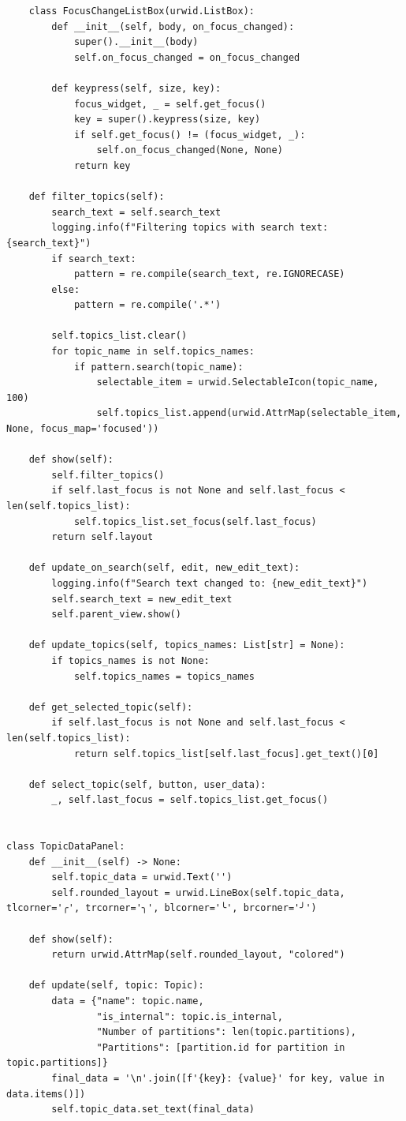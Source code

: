\documentclass[10pt , a4paper]{report}
\newenvironment{code}{\captionsetup{type=listing}}{}
\begin{document}
\begin{code}
\begin{verbatim}
    class FocusChangeListBox(urwid.ListBox):
        def __init__(self, body, on_focus_changed):
            super().__init__(body)
            self.on_focus_changed = on_focus_changed

        def keypress(self, size, key):
            focus_widget, _ = self.get_focus()
            key = super().keypress(size, key)
            if self.get_focus() != (focus_widget, _):
                self.on_focus_changed(None, None)
            return key
        
    def filter_topics(self):
        search_text = self.search_text
        logging.info(f"Filtering topics with search text: {search_text}")
        if search_text:
            pattern = re.compile(search_text, re.IGNORECASE)
        else:
            pattern = re.compile('.*')
        
        self.topics_list.clear()
        for topic_name in self.topics_names:
            if pattern.search(topic_name):
                selectable_item = urwid.SelectableIcon(topic_name, 100)
                self.topics_list.append(urwid.AttrMap(selectable_item, None, focus_map='focused'))

    def show(self):
        self.filter_topics()
        if self.last_focus is not None and self.last_focus < len(self.topics_list):
            self.topics_list.set_focus(self.last_focus)
        return self.layout
    
    def update_on_search(self, edit, new_edit_text):
        logging.info(f"Search text changed to: {new_edit_text}")
        self.search_text = new_edit_text
        self.parent_view.show()
            
    def update_topics(self, topics_names: List[str] = None):
        if topics_names is not None:
            self.topics_names = topics_names

    def get_selected_topic(self):
        if self.last_focus is not None and self.last_focus < len(self.topics_list):
            return self.topics_list[self.last_focus].get_text()[0]

    def select_topic(self, button, user_data):
        _, self.last_focus = self.topics_list.get_focus()


class TopicDataPanel:
    def __init__(self) -> None:
        self.topic_data = urwid.Text('')
        self.rounded_layout = urwid.LineBox(self.topic_data, tlcorner='╭', trcorner='╮', blcorner='╰', brcorner='╯')

    def show(self):
        return urwid.AttrMap(self.rounded_layout, "colored")

    def update(self, topic: Topic):
        data = {"name": topic.name,
                "is_internal": topic.is_internal,
                "Number of partitions": len(topic.partitions),
                "Partitions": [partition.id for partition in topic.partitions]}
        final_data = '\n'.join([f'{key}: {value}' for key, value in data.items()])
        self.topic_data.set_text(final_data)

  \end{verbatim}
\end{code}
\end{document}
